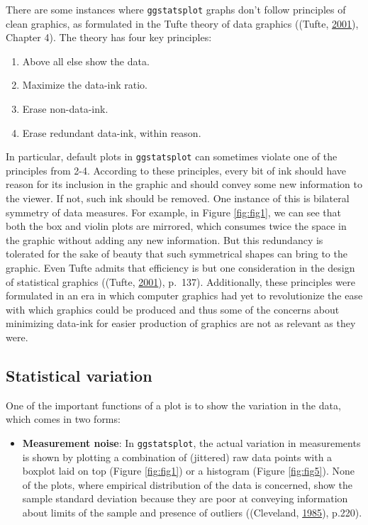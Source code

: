\documentclass[]{article}
\providecommand{\tightlist}{%
  \setlength{\itemsep}{0pt}\setlength{\parskip}{0pt}}
\begin{document}
There are some instances where \texttt{ggstatsplot} graphs don't follow principles of
clean graphics, as formulated in the Tufte theory of data graphics
((Tufte, \protect\hyperlink{ref-tufteVisualDisplayQuantitative2001}{2001}), Chapter 4). The theory has four key
principles:

\begin{enumerate}
\def\labelenumi{\arabic{enumi}.}
\tightlist
\item
  Above all else show the data.
\item
  Maximize the data-ink ratio.
\item
  Erase non-data-ink.
\item
  Erase redundant data-ink, within reason.
\end{enumerate}

In particular, default plots in \texttt{ggstatsplot} can sometimes violate one of the
principles from 2-4. According to these principles, every bit of ink should have
reason for its inclusion in the graphic and should convey some new information
to the viewer. If not, such ink should be removed. One instance of this is
bilateral symmetry of data measures. For example, in Figure \ref{fig:fig1}, we
can see that both the box and violin plots are mirrored, which consumes twice
the space in the graphic without adding any new information. But this redundancy
is tolerated for the sake of beauty that such symmetrical shapes can bring to
the graphic. Even Tufte admits that efficiency is but one consideration in the
design of statistical graphics ((Tufte, \protect\hyperlink{ref-tufteVisualDisplayQuantitative2001}{2001}),
p.~137). Additionally, these principles were formulated in an era in which
computer graphics had yet to revolutionize the ease with which graphics could be
produced and thus some of the concerns about minimizing data-ink for easier
production of graphics are not as relevant as they were.

\hypertarget{statistical-variation}{%
\subsection{Statistical variation}\label{statistical-variation}}

One of the important functions of a plot is to show the variation in the data,
which comes in two forms:

\begin{itemize}
\tightlist
\item
  \textbf{Measurement noise}: In \texttt{ggstatsplot}, the actual variation in
  measurements is shown by plotting a combination of (jittered) raw data
  points with a boxplot laid on top (Figure \ref{fig:fig1}) or a histogram
  (Figure \ref{fig:fig5}). None of the plots, where empirical distribution of
  the data is concerned, show the sample standard deviation because they are
  poor at conveying information about limits of the sample and presence of
  outliers ((Cleveland, \protect\hyperlink{ref-clevelandElementsGraphingData1985}{1985}), p.220).
\end{itemize}
\end{document}
